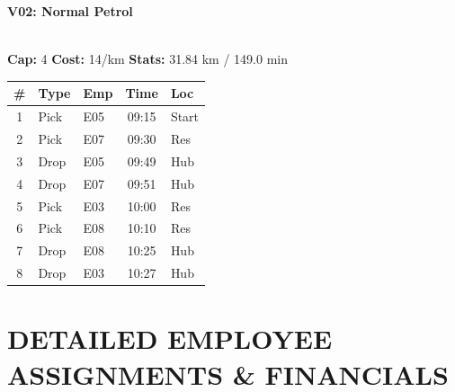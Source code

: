 \documentclass[a4paper,11pt]{article}
\begin{document}
\begin{minipage}[t]{0.49\textwidth}
    \centering
    \colorbox{velorablue}{\parbox{\dimexpr\linewidth-2\fboxsep}{\centering \color{white}\large\textbf{V02: Normal Petrol}}} \\
    \vspace{0.1cm}
    {\small \textbf{Cap:} 4 \quad \textbf{Cost:} 14/km \quad \textbf{Stats:} 31.84 km / 149.0 min}
    
    \vspace{0.2cm}

    \renewcommand{\arraystretch}{1.2}
    \begin{tabular}{c l l c l}
        \toprule
        \textbf{\#} & \textbf{Type} & \textbf{Emp} & \textbf{Time} & \textbf{Loc} \\
        \midrule
        1 & \color{velorablue}Pick & E05 & 09:15 & Start \\
        \rowcolor{headergray} 2 & \color{velorablue}Pick & E07 & 09:30 & Res \\
        3 & Drop & E05 & 09:49 & Hub \\
        \rowcolor{headergray} 4 & Drop & E07 & 09:51 & Hub \\
        5 & \color{velorablue}Pick & E03 & 10:00 & Res \\
        \rowcolor{headergray} 6 & \color{velorablue}Pick & E08 & 10:10 & Res \\
        7 & Drop & E08 & 10:25 & Hub \\
        \rowcolor{headergray} 8 & Drop & E03 & 10:27 & Hub \\
        \bottomrule
    \end{tabular}
\end{minipage}

\vspace{0.1cm}

\section*{\textcolor{velorablue}{\uppercase{Detailed Employee Assignments \& Financials}}}
\vspace{-0.2cm}
\end{document}
